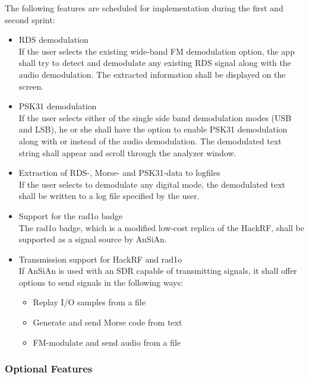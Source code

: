 The following features are scheduled for implementation during the first and
second sprint:
\begin{itemize}
	\item \ac{RDS} demodulation \\
		If the user selects the existing wide-band \ac{FM} demodulation option,
		the app shall try to detect and demodulate any existing \ac{RDS}
		signal along with the audio demodulation. The extracted information
		shall be displayed on the screen.
	\item \ac{PSK31} demodulation \\
		If the user selects either of the single side band demodulation modes
		(\ac{USB} and \ac{LSB}), he or she shall have the option to enable
		\ac{PSK31} demodulation along with or instead of the audio demodulation.
		The demodulated text string shall appear and scroll through the
		analyzer window.
	\item Extraction of RDS-, Morse- and \ac{PSK31}-data to logfiles \\
		If the user selects to demodulate any digital mode, the demodulated
		text shall be written to a log file specified by the user.
	\item Support for the rad1o badge \\
		The rad1o badge, which is a modified low-cost replica of the HackRF,
		shall be supported as a signal source by \ac{AnSiAn}.
	\item Transmission support for HackRF and rad1o \\
		If \ac{AnSiAn} is used with an \ac{SDR} capable of transmitting signals,
		it shall offer options to send signals in the following ways:
		\begin{itemize}
			\item Replay I/O samples from a file
			\item Generate and send Morse code from text
			\item FM-modulate and send audio from a file
		\end{itemize}
\end{itemize}

\subsubsection{Optional Features}

